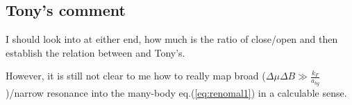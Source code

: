 \subsection{Tony's comment}
I should look into at either end, how much is the ratio of close/open and then establish the relation between \cite{JacksonNarrow} and Tony's. 

However, it is still not clear to me how to really map broad ($\Delta\mu\Delta{}B\gg\frac{k_F}{a_{bg}}$)/narrow resonance into the many-body eq.(\ref{eq:renomal1}) in a calculable sense.  